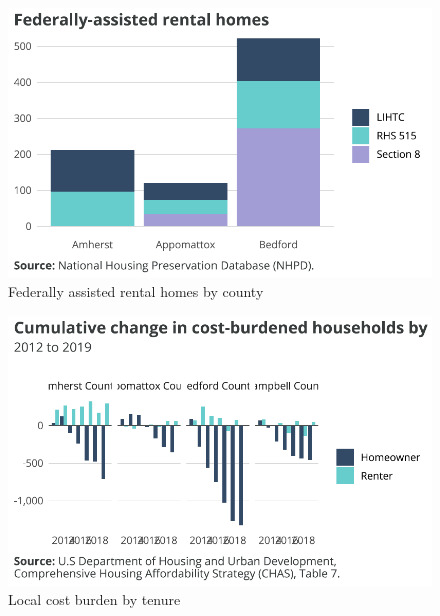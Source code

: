 \documentclass[
  letterpaper,
  DIV=11,
  numbers=noendperiod]{scrreprt}
\begin{document}
\begin{figure}[H]

{\centering \includegraphics{./part-3-2_files/figure-pdf/fig-nhpd-1.pdf}

}

\caption{\label{fig-nhpd}Federally assisted rental homes by county}

\end{figure}

\begin{figure}[H]

{\centering \includegraphics{./part-3-2_files/figure-pdf/fig-cb-tenure-1.pdf}

}

\caption{\label{fig-cb-tenure}Local cost burden by tenure}

\end{figure}
\end{document}
